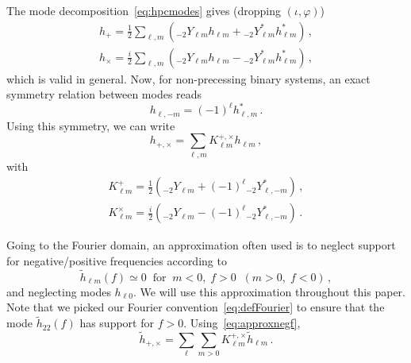 \documentclass[aps,showpacs,twocolumn,prd,superscriptaddress,nofootinbib]{revtex4-1}
\newcommand{\be}{\begin{equation}}
\newcommand{\ee}{\end{equation}}
\newcommand{\bsub}{\begin{subequations}}
\newcommand{\esub}{\end{subequations}}
\newcommand{\sYlm}{{}_{-2}Y_{\ell m}}
\newcommand{\sYlmstar}{{}_{-2}Y_{\ell m}^{*}}
\newcommand{\sYlminusmstar}{{}_{-2}Y_{\ell, -m}^{*}}
\begin{document}
The mode decomposition~\eqref{eq:hpcmodes} gives (dropping $(\iota, \varphi)$)
\bsub
\begin{align}
	h_{+} = \frac{1}{2} \sum_{\ell, m} \left( \sYlm h_{\ell m} + \sYlmstar h_{\ell m}^{*} \right) \,,\\
	h_{\times} = \frac{i}{2} \sum_{\ell, m} \left( \sYlm h_{\ell m} - \sYlmstar h_{\ell m}^{*} \right) \,,
\end{align}
\esub
which is valid in general. Now, for non-precessing binary systems, an exact symmetry relation between modes reads
\be\label{eq:nonprecsymmetry}
	h_{\ell, -m} = (-1)^{\ell} h_{\ell, m}^{*} \,.
\ee
Using this symmetry, we can write
\be
	h_{+,\times} = \sum_{\ell, m} K_{\ell m}^{+, \times} h_{\ell m} \,, 
\ee
with
\bsub
\begin{align}
	K_{\ell m}^{+} =\frac{1}{2} \left( \sYlm + (-1)^{\ell} \sYlminusmstar \right) \,,\\
	K_{\ell m}^{\times} = \frac{i}{2} \left( \sYlm - (-1)^{\ell} \sYlminusmstar \right) \,.
\end{align}
\esub

Going to the Fourier domain, an approximation often used is to neglect support for negative/positive frequencies according to
\be\label{eq:approxnegf}
	\tilde{h}_{\ell m} (f) \simeq 0 \;\; \text{for} \;\; m<0, \; f>0 \;\; ( m>0, \; f<0 )\,,
\ee
and neglecting modes $h_{\ell 0}$. We will use this approximation throughout this paper. Note that we picked our Fourier convention~\eqref{eq:defFourier} to ensure that the mode $\tilde{h}_{22} (f)$ has support for $f>0$. Using~\eqref{eq:approxnegf},
\be
	\tilde{h}_{+,\times} = \sum_{\ell} \sum_{m>0} K_{\ell m}^{+, \times} \tilde{h}_{\ell m} \,.
\ee
\end{document}
